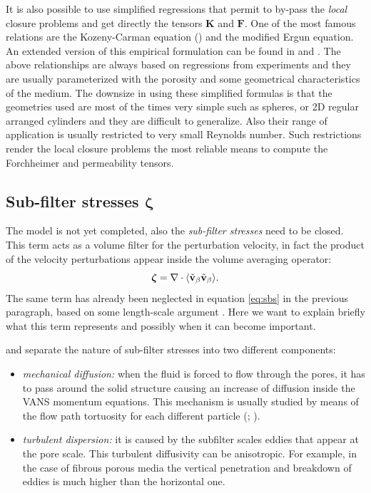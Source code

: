 It is also possible to use simplified regressions that permit to by-pass the \textit{local} closure problems and get directly the tensors $\mathbf{K}$ and $\mathbf{F}$.
One of the most famous relations are the Kozeny-Carman equation (\citet{kozeny}) and the modified Ergun equation.
An extended version of this empirical formulation can be found in \citet{zampogna2016fluid} and \citet{yazdchi2012towards}.
The above relationships are always based on regressions from experiments and they are usually parameterized with the porosity and some geometrical characteristics of the medium. The downsize in using these simplified formulas is that the geometries used are most of the times very simple such as spheres, or 2D regular arranged cylinders and they are difficult to generalize. Also their range of application is usually restricted to very small Reynolds number. Such restrictions render the local closure problems the most reliable means to compute the Forchheimer and permeability tensors.

\subsection{Sub-filter stresses $\boldsymbol{\zeta}$}

The model is not yet completed, also the \textit{sub-filter stresses} need to be closed. This term acts as a volume filter for the perturbation velocity, in fact the product of the velocity perturbations appear inside the volume averaging operator:
$$\boldsymbol{\zeta} = \nabla \cdot {\left< \tilde{\textbf{v}}_{\beta}\tilde{\textbf{v}}_{\beta}\right>}.$$
The same term has already been neglected in equation \eqref{eq:sbs} in the previous paragraph, based on some length-scale argument  \citep{whitaker1996forchheimer}.  Here we want to explain briefly what this term represents and possibly when it can become important.

\citet{breugem2006influence} and \citet{nepf1999drag} separate the nature of sub-filter stresses into two different components:
\begin{itemize}
	\item \textit{mechanical diffusion:} when the fluid is forced to flow through the pores, it has to pass around the solid structure causing an increase of diffusion inside the VANS momentum equations. This mechanism is usually studied by means of the flow path tortuosity for each different particle (\citet{duda2011hydraulic}; \citet{sivanesapillai2014transition}).
	\item \textit{turbulent dispersion:} it is caused by the subfilter scales eddies that appear at the pore scale. This turbulent diffusivity can be anisotropic. For example, in the case of fibrous porous media the vertical penetration and breakdown of eddies is much higher than the horizontal one.
\end{itemize}

